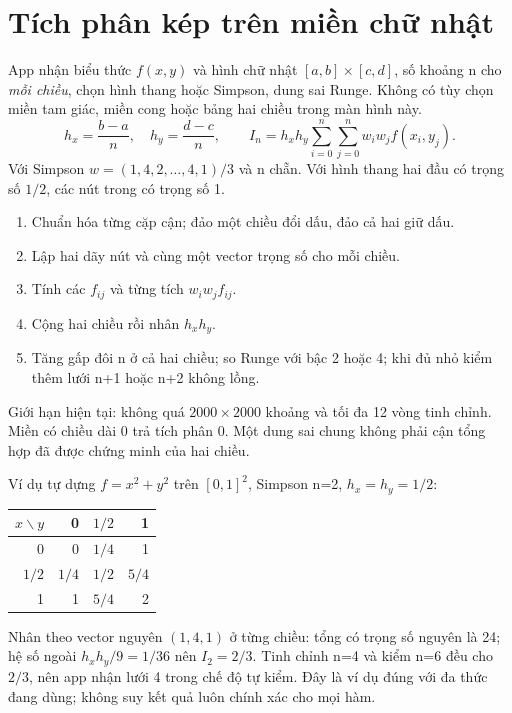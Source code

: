 \section{Tích phân kép trên miền chữ nhật}
\label{sec:double-integral}
App nhận biểu thức $f(x,y)$ và hình chữ nhật $[a,b]\times[c,d]$, số khoảng n cho \emph{mỗi chiều}, chọn hình thang hoặc Simpson, dung sai Runge. Không có tùy chọn miền tam giác, miền cong hoặc bảng hai chiều trong màn hình này.
\[
h_x=\frac{b-a}{n},\quad h_y=\frac{d-c}{n},\qquad
I_n=h_xh_y\sum_{i=0}^{n}\sum_{j=0}^{n}w_iw_j f(x_i,y_j).
\]
Với Simpson $w=(1,4,2,\ldots,4,1)/3$ và n chẵn. Với hình thang hai đầu có trọng số $1/2$, các nút trong có trọng số 1.
\begin{enumerate}
\item Chuẩn hóa từng cặp cận; đảo một chiều đổi dấu, đảo cả hai giữ dấu.
\item Lập hai dãy nút và cùng một vector trọng số cho mỗi chiều.
\item Tính các $f_{ij}$ và từng tích $w_iw_jf_{ij}$.
\item Cộng hai chiều rồi nhân $h_xh_y$.
\item Tăng gấp đôi n ở cả hai chiều; so Runge với bậc 2 hoặc 4; khi đủ nhỏ kiểm thêm lưới n+1 hoặc n+2 không lồng.
\end{enumerate}
Giới hạn hiện tại: không quá $2000\times2000$ khoảng và tối đa 12 vòng tinh chỉnh. Miền có chiều dài 0 trả tích phân 0. Một dung sai chung không phải cận tổng hợp đã được chứng minh của hai chiều.

Ví dụ tự dựng $f=x^2+y^2$ trên $[0,1]^2$, Simpson n=2, $h_x=h_y=1/2$:
\begin{center}\begin{tabular}{r|rrr}
\toprule $x\backslash y$&0&$1/2$&1\\\midrule
0&0&$1/4$&1\\
$1/2$&$1/4$&$1/2$&$5/4$\\
1&1&$5/4$&2\\\bottomrule
\end{tabular}\end{center}
Nhân theo vector nguyên $(1,4,1)$ ở từng chiều: tổng có trọng số nguyên là 24; hệ số ngoài $h_xh_y/9=1/36$ nên $I_2=2/3$. Tinh chỉnh n=4 và kiểm n=6 đều cho $2/3$, nên app nhận lưới 4 trong chế độ tự kiểm. Đây là ví dụ đúng với đa thức đang dùng; không suy kết quả luôn chính xác cho mọi hàm.


